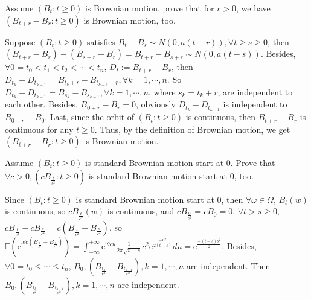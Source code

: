 \documentclass{ctexart}
\newif\ifpreface
\begin{document}
\large
\setlength{\baselineskip}{1.2em}
\ifpreface
  
\else
\fi
{}
\begin{problem}\label{pro:1}
  Assume \((B_t:t \geq 0)\) is Brownian motion, prove that for \(r>0\), we have \((B_{t + r}-B_r:t \geq 0)\) is Brownian motion, too.
\end{problem}
\begin{solution}
  Suppose \((B_t : t \geq 0)\) satisfies \(B_t-B_s \sim N(0,a(t-r)), \forall t \geq s \geq 0\), then \((B_{t + r} - B_{r})-(B_{s + r}-B_{r})=B_{t + r}- B_{s + r} \sim N(0,a(t-s))\).
  Besides, \(\forall 0=t_0 < t_1 < t_2 < \cdots < t_n\), \(D_{t}:= B_{t + r}- B_r\), then \(D_{t_k}-D_{t_{k-1}}=B_{t_k + r}-B_{t_{k-1} + r}, \forall k=1,\cdots,n\).
  So \(D_{t_k}-D_{t_{k-1}}=B_{s_{k}}-B_{s_{k-1}}, \forall k = 1,\cdots,n\), where \(s_k=t_k + r\), are independent to each other.
  Besides, \(B_{0 + r}-B_{r}=0\), obviously \(D_{t_k}-D_{t_{k-1}}\) is independent to \(B_{0 + r}-B_0\).
  Last, since the orbit of \((B_t: t \geq 0 )\) is continuous, then \(B_{t + r}-B_{r}\) is continuous for any \(t \geq 0\).
  Thus, by the definition of Brownian motion, we get \((B_{t + r}-B_r: t \geq 0)\) is Brownian motion.
\end{solution}

\begin{problem}\label{pro:2}
  Assume \((B_t:t \geq 0)\) is standard Brownian motion start at \(0\).
  Prove that \(\forall c>0,(c B_{\frac{t}{c^2}}:t \geq 0)\) is standard Brownian motion start at \(0\), too.
\end{problem}
\begin{solution}
  Since \((B_t:t \geq 0)\) is standard Brownian motion start at 0, then \(\forall \omega \in \Omega\), \(B_t(w)\) is continuous,
  so \(c B_{\frac{t}{c^2}}(w)\) is continuous, and \(cB_{\frac{0}{c^2}}=cB_0=0\). \(\forall t > s \geq 0\),
  \(cB_{\frac{t}{c^2}}-cB_{\frac{s}{c^2}}=c(B_{\frac{t}{c^2}}-B_{\frac{s}{c^2}})\), so
  \(\mathbb{E}(\mathrm{e}^{\mathrm{i}\theta c(B_{\frac{t}{c^2}}-B_{\frac{s}{c^2}})})=\int_{-\infty}^{+\infty}\mathrm{e}^{\mathrm{i} \theta c u}\frac{1}{2\pi \sqrt{t-s}}c^2 \mathrm{e}^{\frac{-u^2}{2(t-s)}}du=\mathrm{e}^{\frac{-(t-s)\theta^2}{2}}\).
  Besides, \(\forall 0 = t_0 \leq \cdots \leq t_n\), \(B_0,(B_{\frac{t_k}{c^2}}-B_{\frac{t_{k-1}}{c^2}}),k=1,\cdots,n\) are independent.
  Then \(B_0,(B_{\frac{t_k}{c^2}}-B_{\frac{t_{k-1}}{c^2}}),k=1,\cdots,n\) are independent.
\end{solution}
\end{document}
